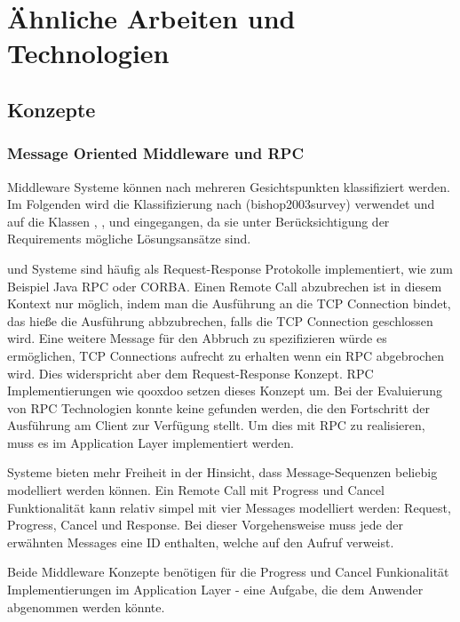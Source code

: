 
\chapter{Ähnliche Arbeiten und Technologien}

\section{Konzepte}

\subsection{Message Oriented Middleware und RPC}
Middleware Systeme können nach mehreren Gesichtspunkten klassifiziert werden.
Im Folgenden wird die Klassifizierung nach (bishop2003survey) verwendet und auf die Klassen , , und  eingegangen, da sie unter Berücksichtigung der Requirements mögliche Lösungsansätze sind.

 und  Systeme sind häufig als Request-Response  Protokolle implementiert, wie zum Beispiel Java RPC oder CORBA.
Einen Remote Call abzubrechen ist in diesem Kontext nur möglich, indem man die Ausführung an die TCP Connection bindet, das hieße die Ausführung abbzubrechen, falls die TCP Connection geschlossen wird.
Eine weitere Message für den Abbruch zu spezifizieren würde es ermöglichen, TCP Connections aufrecht zu erhalten wenn ein RPC abgebrochen wird.
Dies widerspricht aber dem Request-Response Konzept.
RPC Implementierungen wie qooxdoo setzen dieses Konzept um.
Bei der Evaluierung von RPC Technologien konnte keine gefunden werden, die den Fortschritt der Ausführung am Client zur Verfügung stellt.
Um dies mit RPC zu realisieren, muss es im Application Layer implementiert werden.

 Systeme bieten mehr Freiheit in der Hinsicht, dass Message-Sequenzen beliebig modelliert werden können.
Ein Remote Call mit Progress und Cancel Funktionalität kann relativ simpel mit vier Messages  modelliert werden:
Request, Progress, Cancel und Response.
Bei dieser Vorgehensweise muss jede der erwähnten Messages eine ID enthalten, welche auf den Aufruf verweist.

Beide Middleware Konzepte benötigen für die Progress und Cancel Funkionalität Implementierungen im Application Layer - eine Aufgabe, die dem Anwender abgenommen werden könnte.




